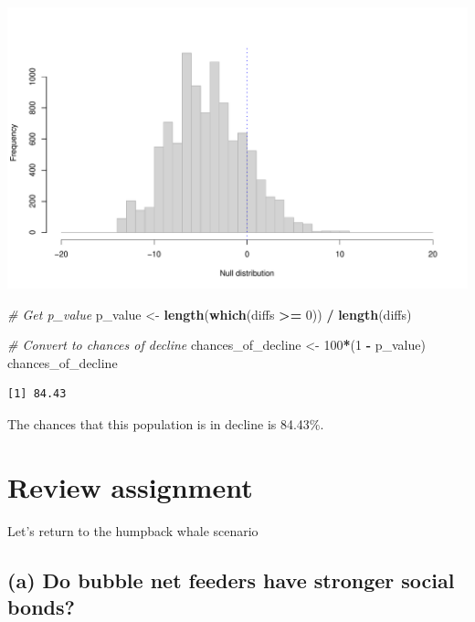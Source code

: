 \documentclass[
]{book}
\newenvironment{Shaded}{\begin{snugshade}}{\end{snugshade}}
\newcommand{\CommentTok}[1]{\textcolor[rgb]{0.56,0.35,0.01}{\textit{#1}}}
\newcommand{\DecValTok}[1]{\textcolor[rgb]{0.00,0.00,0.81}{#1}}
\newcommand{\KeywordTok}[1]{\textcolor[rgb]{0.13,0.29,0.53}{\textbf{#1}}}
\newcommand{\NormalTok}[1]{#1}
\newcommand{\OperatorTok}[1]{\textcolor[rgb]{0.81,0.36,0.00}{\textbf{#1}}}
\newcommand{\StringTok}[1]{\textcolor[rgb]{0.31,0.60,0.02}{#1}}
\begin{document}
\includegraphics{figures/unnamed-chunk-330-1.pdf}

\begin{Shaded}
\begin{Highlighting}[]
\CommentTok{# Get p_value}
\NormalTok{p_value <-}\StringTok{ }\KeywordTok{length}\NormalTok{(}\KeywordTok{which}\NormalTok{(diffs }\OperatorTok{>=}\StringTok{ }\DecValTok{0}\NormalTok{)) }\OperatorTok{/}\StringTok{ }\KeywordTok{length}\NormalTok{(diffs)}

\CommentTok{# Convert to chances of decline}
\NormalTok{chances_of_decline <-}\StringTok{ }\DecValTok{100}\OperatorTok{*}\NormalTok{(}\DecValTok{1} \OperatorTok{-}\StringTok{ }\NormalTok{p_value)}
\NormalTok{chances_of_decline}
\end{Highlighting}
\end{Shaded}

\begin{verbatim}
[1] 84.43
\end{verbatim}

The chances that this population is in decline is 84.43\%.

\hypertarget{review-assignment-11}{%
\section*{Review assignment}\label{review-assignment-11}}

Let's return to the humpback whale scenario

\hypertarget{a-do-bubble-net-feeders-have-stronger-social-bonds}{%
\subsection*{(a) Do bubble net feeders have stronger social bonds?}\label{a-do-bubble-net-feeders-have-stronger-social-bonds}}
\end{document}
